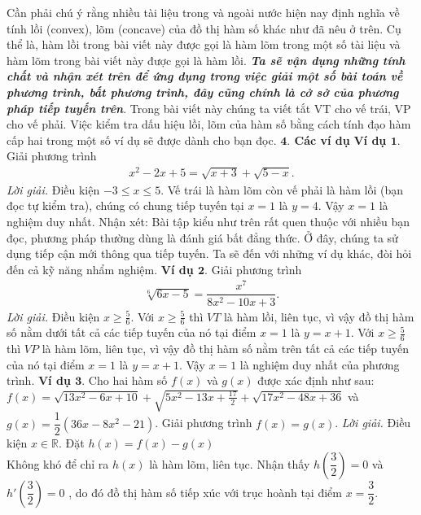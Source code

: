 \begin{multicols}{2}
\begin{center}
\begin{tikzpicture}
		\end{tikzpicture}
	\end{center}
	Cần phải chú ý rằng nhiều tài liệu trong và ngoài nước hiện nay định nghĩa về tính lồi (convex), lõm (concave) của đồ thị hàm số khác như đã nêu ở trên. Cụ thể là, hàm lồi trong bài viết này được gọi là hàm lõm trong một số tài liệu và hàm lõm trong bài viết này được gọi là hàm lồi.
	\vskip 0.1cm
	\textit{\textbf{\color{diendantoanhoc}Ta sẽ vận dụng những tính chất và nhận xét trên để ứng dụng trong việc giải một số bài toán về phương trình, bất phương trình, đây cũng chính là cở sở của phương pháp tiếp tuyến trên}}.
	\vskip 0.1cm
	Trong bài viết này chúng ta viết tắt VT cho vế trái, VP cho vế phải.
	Việc kiểm tra dấu hiệu lồi, lõm của hàm số bằng cách tính đạo hàm cấp hai trong một số ví dụ sẽ được dành cho bạn đọc.
	\vskip 0.1cm
	\textbf{\color{diendantoanhoc}$\pmb{4.}$ Các ví dụ}
	\vskip 0.1cm
	\textbf{\color{diendantoanhoc}Ví dụ $\pmb{1.}$} Giải phương trình
	\begin{align*}
		x^2-2x+5=\sqrt{x+3}+\sqrt{5-x}.
	\end{align*}
	\textit{Lời giải.} Điều kiện $-3\leq x\leq 5$. Vế trái là hàm lõm còn vế phải là hàm lồi (bạn đọc tự kiểm tra), chúng có chung tiếp tuyến tại $x=1$ là $y=4$. Vậy $x=1$ là nghiệm duy nhất.
	\vskip 0.1cm
	Nhận xét: Bài tập kiểu như trên rất quen thuộc với nhiều bạn đọc, phương pháp thường dùng là đánh giá bất đẳng thức. Ở đây, chúng ta sử dụng tiếp cận mới thông qua tiếp tuyến.
	\vskip 0.1cm
	Ta sẽ đến với những ví dụ khác, đòi hỏi đến cả kỹ năng nhẩm nghiệm.
	\vskip 0.1cm
	\textbf{\color{diendantoanhoc}Ví dụ $\pmb{2.}$} Giải phương trình
	\begin{align*}
		\sqrt[6]{6x-5}=\dfrac{x^{7}}{8x^{2}-10x+3}.
	\end{align*}
	\textit{Lời giải.} Điều kiện $x\ge \frac{5}{6}$. Với $x\ge \frac{5}{6}$ thì $VT$ là hàm lồi, liên tục, vì vậy đồ thị hàm số nằm dưới tất cả các tiếp tuyến của nó tại điểm $x=1$ là $y=x+1$.
	Với $x\ge\frac{5}{6}$ thì $VP$ là hàm lõm, liên tục, vì vậy đồ thị hàm số nằm trên tất cả các tiếp tuyến của nó tại điểm $x=1$ là $y=x+1$.
	\vskip 0.1cm
	Vậy $x=1$ là nghiệm duy nhất của phương trình. 
	\vskip 0.1cm
	\textbf{\color{diendantoanhoc}Ví dụ $\pmb{3.}$} Cho hai hàm số $f(x)$ và $g(x)$ được xác định như sau: $f(x)=\sqrt{13x^{2} - 6x + 10 } + \sqrt{5x^{2} -13x + \frac{17}{2}} + \sqrt{17x^{2} - 48x + 36} $ và $g(x)= \dfrac{1}{2}(36x - 8x^{2} - 21)$.
	\vskip 0.1cm
	Giải phương trình $f(x)=g(x)$.
	\vskip 0.1cm
	\textit{Lời giải.} Điều kiện $x\in \mathbb R$. Đặt $h(x)=f(x)-g(x)$\\ Không khó để chỉ ra $h(x)$ là hàm lõm, liên tục. Nhận thấy $h(\dfrac{3}{2})=0$ và $h'(\dfrac 32)=0$ , do đó đồ thị hàm số tiếp xúc với trục hoành tại điểm $x=\dfrac{3}{2}$.

\end{multicols}
